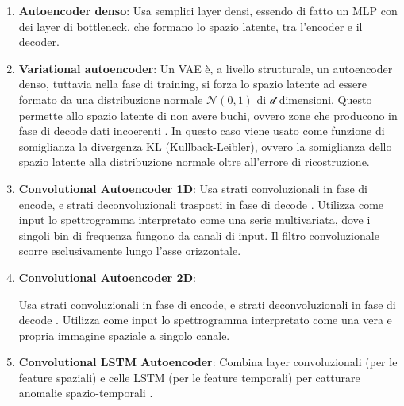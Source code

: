 \begin{enumerate}
	\item \textbf{Autoencoder denso}:
	Usa semplici layer densi, essendo di fatto un MLP con dei layer di bottleneck, che formano lo spazio latente, tra l'encoder e il decoder.

	\item \textbf{Variational
		autoencoder}:
		Un VAE è, a livello strutturale, un autoencoder denso, tuttavia nella fase di training, si forza lo spazio latente ad essere formato da una distribuzione normale $\mathcal{N}(0, 1)$ di $\mathcal{d}$ dimensioni. Questo permette allo spazio latente di non avere buchi, ovvero zone che producono in fase di decode dati incoerenti \cite{kingma2013auto}. In questo caso viene usato come funzione di somiglianza la divergenza KL (Kullback-Leibler), ovvero la somiglianza dello spazio latente alla distribuzione normale oltre all'errore di ricostruzione.


	\item \textbf{Convolutional Autoencoder 1D}:
	Usa strati convoluzionali in fase di encode, e strati deconvoluzionali trasposti in fase di decode \cite{masci2011cae}. Utilizza come input lo spettrogramma interpretato come una serie multivariata, dove i singoli bin di frequenza fungono da canali di input. Il filtro convoluzionale scorre esclusivamente lungo l'asse orizzontale.



	\item \textbf{Convolutional Autoencoder 2D}:

	Usa strati convoluzionali in fase di encode, e strati deconvoluzionali in fase di decode \cite{masci2011cae}. Utilizza come input lo spettrogramma interpretato come una vera e propria immagine spaziale a singolo canale.

	\item \textbf{Convolutional LSTM Autoencoder}:
Combina layer convoluzionali (per le feature spaziali) e celle LSTM (per le feature temporali) per catturare anomalie spazio-temporali \cite{shi2015convlstm}.
\end{enumerate}
